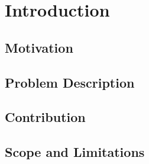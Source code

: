 \chapter{Introduction}
\label{ch:introduction}

% 

\section{Motivation}
\label{sec:motivation}


\section{Problem Description}
\label{sec:problem-description}

% 

\section{Contribution}
\label{sec:contribution}


\section{Scope and Limitations}
\label{sec:scope-limitations}


